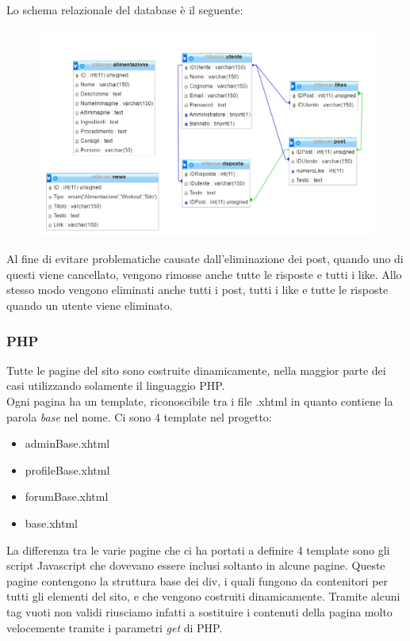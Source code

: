 Lo schema relazionale del database è il seguente: 

\begin{figure}
	\centering
	\includegraphics[width=18cm]{img/database.png}
\end{figure}
\newpage
Al fine di evitare problematiche causate dall'eliminazione dei post, quando uno di questi viene cancellato, vengono rimosse anche tutte le risposte e tutti i like. Allo stesso modo vengono eliminati anche tutti i post, tutti i like e tutte le risposte quando un utente viene eliminato.

\subsubsection{PHP}\label{subs:php}

Tutte le pagine del sito sono costruite dinamicamente, nella maggior parte dei casi utilizzando solamente il linguaggio PHP.\\
Ogni pagina ha un template, riconoscibile tra i file .xhtml in quanto contiene la parola \textit{base} nel nome. Ci sono 4 template nel progetto:

\begin{itemize}
    
	\item adminBase.xhtml
    \item profileBase.xhtml
	\item forumBase.xhtml
	\item base.xhtml
	
\end{itemize}

La differenza tra le varie pagine che ci ha portati a definire 4 template sono gli script Javascript che dovevano essere inclusi soltanto in alcune pagine. Queste pagine contengono la struttura base dei div, 
i quali fungono da contenitori per tutti gli elementi del sito, e che vengono costruiti dinamicamente. Tramite alcuni tag vuoti non validi riusciamo infatti a sostituire i contenuti della pagina molto velocemente tramite i parametri \textit{get} di PHP.\\

